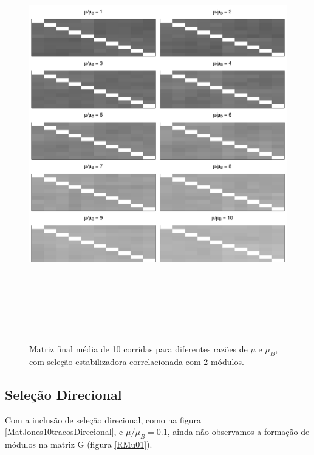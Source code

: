 \begin{center}
\begin{figure}[htbp]
  \includegraphics[width=150mm, height=180mm]{figuras/MatBEstabRMu}
   \caption{Matriz final média de 10 corridas para diferentes razões de
   $\mu$ e $\mu_B$, com seleção estabilizadora correlacionada com 2
   módulos.}
  \label{MatBEstab}
\end{figure}
\end{center}


\subsection{Seleção Direcional}

Com a inclusão de seleção direcional, como na figura
\ref{MatJones10tracosDirecional}, e $\mu/\mu_B = 0.1$, ainda não
observamos a formação de módulos na matriz G (figura \ref{RMu01}). 


